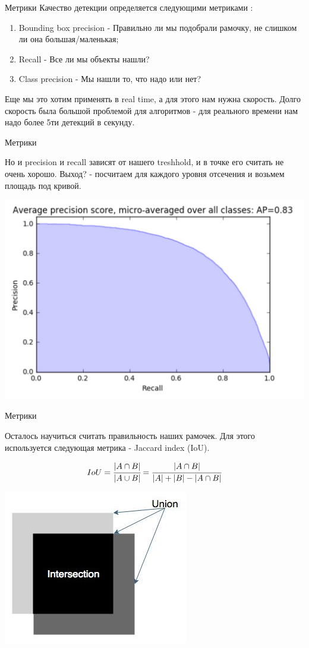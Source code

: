 \documentclass[notes,12pt, aspectratio=169]{beamer}
\begin{document}
\begin{frame}{Метрики}
Качество детекции определяется следующими метриками :
\begin{enumerate}
	\item Bounding box precision - Правильно ли мы подобрали рамочку, не слишком ли она большая/маленькая;
	\item Recall - Все ли мы объекты нашли?
	\item Class precision -  Мы нашли то, что надо или нет?
\end{enumerate}

Еще мы это хотим применять в real time, а для этого нам нужна скорость. Долго скорость была большой проблемой для алгоритмов - для реального времени нам надо более 5ти детекций в секунду.
\end{frame}

\begin{frame}{Метрики}

Но и precision и recall зависят от нашего treshhold, и в точке его считать не очень хорошо. Выход? - посчитаем для каждого уровня отсечения и возьмем площадь под кривой.
\begin{center}
\includegraphics[width=.65\linewidth]{precision_recall.jpg}
\end{center}

\end{frame}

\begin{frame}{Метрики}
	
Осталось научиться считать правильность наших рамочек. Для этого используется следующая метрика - Jaccard index (IoU).

\begin{equation}
	IoU = \cfrac{|A \cap B|}{|A \cup B|} = \cfrac{|A \cap B|}{|A|+|B| - |A \cap B|}
\end{equation}

\begin{center}
	\includegraphics[width=.5\linewidth]{JI.jpg}
\end{center}

\end{frame}
\end{document}

